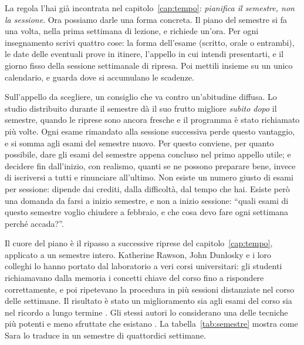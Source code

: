 La regola l'hai già incontrata nel capitolo~\ref{cap:tempo}:
\emph{pianifica il semestre, non la sessione}. Ora possiamo darle una
forma concreta. Il piano del semestre si fa una volta, nella prima
settimana di lezione, e richiede un'ora. Per ogni insegnamento scrivi
quattro cose: la forma dell'esame (scritto, orale o entrambi), le date
delle eventuali prove in itinere, l'appello in cui intendi presentarti,
e il giorno fisso della sessione settimanale di ripresa. Poi mettili
insieme su un unico calendario, e guarda dove si accumulano le
scadenze.

Sull'appello da scegliere, un consiglio che va contro un'abitudine
diffusa. Lo studio distribuito durante il semestre dà il suo frutto
migliore \emph{subito dopo} il semestre, quando le riprese sono ancora
fresche e il programma è stato richiamato più volte. Ogni esame
rimandato alla sessione successiva perde questo vantaggio, e si somma
agli esami del semestre nuovo. Per questo conviene, per quanto
possibile, dare gli esami del semestre appena concluso nel primo
appello utile; e decidere fin dall'inizio, con realismo, quanti se ne
possono preparare bene, invece di iscriversi a tutti e rinunciare
all'ultimo. Non esiste un numero giusto di esami per sessione: dipende
dai crediti, dalla difficoltà, dal tempo che hai. Esiste però una
domanda da farsi a inizio semestre, e non a inizio sessione:
\enquote{quali esami di questo semestre voglio chiudere a febbraio, e
che cosa devo fare ogni settimana perché accada?}.

Il cuore del piano è il ripasso a successive riprese del
capitolo~\ref{cap:tempo}, applicato a un semestre intero. Katherine
Rawson, John Dunlosky e i loro colleghi lo hanno portato dal
laboratorio a veri corsi universitari: gli studenti richiamavano
dalla memoria i concetti chiave del corso fino a rispondere
correttamente, e poi ripetevano la procedura in più sessioni
distanziate nel corso delle settimane. Il risultato è stato un
miglioramento sia agli esami del corso sia nel ricordo a lungo
termine \parencite{rawson2013}. Gli stessi autori lo
considerano una delle tecniche più potenti e meno sfruttate che
esistano \parencite{rawson2022}. La tabella~\ref{tab:semestre} mostra
come Sara lo traduce in un semestre di quattordici settimane.

